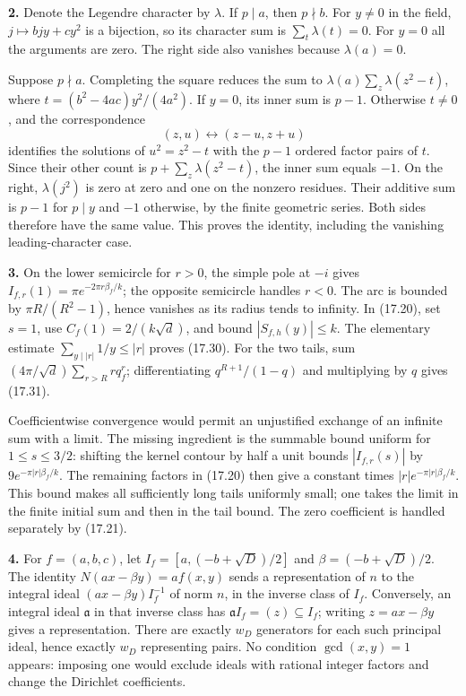 \documentclass[
  11pt,
  a4paper,
]{article}
\begin{document}
\textbf{2.} Denote the Legendre character by \(\lambda\). If
\(p\mid a\), then \(p\nmid b\). For \(y\ne0\) in the field,
\(j\mapsto bjy+cy^2\) is a bijection, so its character sum is
\(\sum_t\lambda(t)=0\). For \(y=0\) all the arguments are zero. The
right side also vanishes because \(\lambda(a)=0\).

Suppose \(p\nmid a\). Completing the square reduces the sum to
\(\lambda(a)\sum_z\lambda(z^2-t)\), where \(t=(b^2-4ac)y^2/(4a^2)\). If
\(y=0\), its inner sum is \(p-1\). Otherwise \(t\ne0\), and the
correspondence \[
 (z,u)\longleftrightarrow(z-u,z+u)
\] identifies the solutions of \(u^2=z^2-t\) with the \(p-1\) ordered
factor pairs of \(t\). Since their other count is
\(p+\sum_z\lambda(z^2-t)\), the inner sum equals \(-1\). On the right,
\(\lambda(j^2)\) is zero at zero and one on the nonzero residues. Their
additive sum is \(p-1\) for \(p\mid y\) and \(-1\) otherwise, by the
finite geometric series. Both sides therefore have the same value. This
proves the identity, including the vanishing leading-character case.

\textbf{3.} On the lower semicircle for \(r>0\), the simple pole at
\(-i\) gives \(I_{f,r}(1)=\pi e^{-2\pi r\beta_f/k}\); the opposite
semicircle handles \(r<0\). The arc is bounded by \(\pi R/(R^2-1)\),
hence vanishes as its radius tends to infinity. In (17.20), set \(s=1\),
use \(C_f(1)=2/(k\sqrt d)\), and bound \(|S_{f,h}(y)|\le k\). The
elementary estimate \(\sum_{y\mid|r|}1/y\le|r|\) proves (17.30). For the
two tails, sum \((4\pi/\sqrt d)\sum_{r>R}r q_f^r\); differentiating
\(q^{R+1}/(1-q)\) and multiplying by \(q\) gives (17.31).

Coefficientwise convergence would permit an unjustified exchange of an
infinite sum with a limit. The missing ingredient is the summable bound
uniform for \(1\le s\le3/2\): shifting the kernel contour by half a unit
bounds \(|I_{f,r}(s)|\) by \(9e^{-\pi|r|\beta_f/k}\). The remaining
factors in (17.20) then give a constant times
\(|r|e^{-\pi|r|\beta_f/k}\). This bound makes all sufficiently long
tails uniformly small; one takes the limit in the finite initial sum and
then in the tail bound. The zero coefficient is handled separately by
(17.21).

\textbf{4.} For \(f=(a,b,c)\), let \(I_f=[a,(-b+\sqrt D)/2]\) and
\(\beta=(-b+\sqrt D)/2\). The identity \(N(ax-\beta y)=af(x,y)\) sends a
representation of \(n\) to the integral ideal \((ax-\beta y)I_f^{-1}\)
of norm \(n\), in the inverse class of \(I_f\). Conversely, an integral
ideal \(\mathfrak a\) in that inverse class has
\(\mathfrak a I_f=(z)\subseteq I_f\); writing \(z=ax-\beta y\) gives a
representation. There are exactly \(w_D\) generators for each such
principal ideal, hence exactly \(w_D\) representing pairs. No condition
\(\gcd(x,y)=1\) appears: imposing one would exclude ideals with rational
integer factors and change the Dirichlet coefficients.
\end{document}
